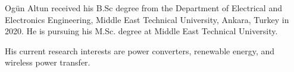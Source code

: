 \documentclass[journal]{IEEEtran}
\begin{document}
\begin{IEEEbiography}
{Ogün Altun} received his B.Sc degree from the Department of Electrical and Electronics Engineering, Middle East Technical University, Ankara, Turkey in 2020. He is pursuing his M.Sc. degree at Middle East Technical University. 

His current research interests are power converters, renewable energy, and wireless power transfer.
\end{IEEEbiography}
\end{document}
